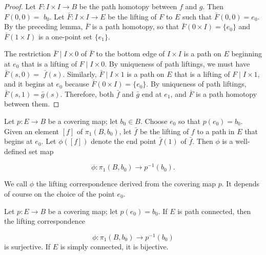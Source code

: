 \begin{proof}
Let \(F : I \times I \rightarrow B\) be the path homotopy between \(f\) and \(g\). Then \(F( {0,0}) =\) \(b_{0}\). Let \(\bar{F} : I \times I \rightarrow E\) be the lifting of \(F\) to \(E\) such that \(\bar{F}( {0,0}) = e_{0}\). By the preceding lemma, \(\bar{F}\) is a path homotopy, so that \(\bar{F}( {0 \times I}) = \{ e_{0}\}\) and \(\bar{F}( {1 \times I})\) is a one-point set \(\{ e_{1}\}\).

The restriction \(\bar{F} \mid I \times 0\) of \(\bar{F}\) to the bottom edge of \(I \times I\) is a path on \(E\) beginning at \(e_{0}\) that is a lifting of \(F \mid I \times 0\). By uniqueness of path liftings, we must have \(\bar{F}( {s,0}) =\) \(\bar{f}( s)\). Similarly, \(\bar{F} \mid I \times 1\) is a path on \(E\) that is a lifting of \(F \mid I \times 1\), and it begins at \(e_{0}\) because \(\bar{F}( {0 \times I}) = \{ e_{0}\}\). By uniqueness of path liftings, \(\bar{F}( {s,1}) = \bar{g}( s)\). Therefore, both \(\bar{f}\) and \(\bar{g}\) end at \(e_{1}\), and \(\bar{F}\) is a path homotopy between them.
\end{proof}

\begin{definition}
Let \(p : E \rightarrow B\) be a covering map; let \(b_{0} \in B\). Choose \(e_{0}\) so that \(p( e_{0}) = b_{0}\). Given an element \([ f]\) of \({\pi }_{1}( {B,b_{0}})\), let \(\bar{f}\) be the lifting of \(f\) to a path in \(E\) that begins at \(e_{0}\). Let \(\phi ( [ f] )\) denote the end point \(\bar{f}(1)\) of \(\bar{f}\). Then \(\phi\) is a well-defined set map

\[
\phi : {\pi }_{1}( {B,b_{0}}) \rightarrow {p}^{-1}( b_{0}).
\]

We call \(\phi\) the lifting correspondence derived from the covering map \(p\). It depends of course on the choice of the point \(e_{0}\).
\end{definition}

\begin{theorem}
\label{thm:\thetheorem}
Let \(p : E \rightarrow B\) be a covering map; let \(p( e_{0}) = b_{0}\). If \(E\) is path connected, then the lifting correspondence

\[
\phi : {\pi }_{1}( {B,b_{0}}) \rightarrow {p}^{-1}( b_{0})
\]
is surjective. If \(E\) is simply connected, it is bijective.
\end{theorem}

